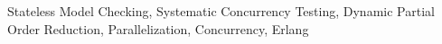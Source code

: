 Stateless Model Checking, Systematic Concurrency Testing, Dynamic Partial Order Reduction, Parallelization, Concurrency, Erlang